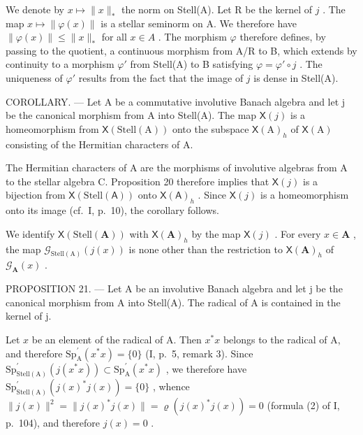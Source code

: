 We denote by \(x \mapsto \|x\|_*\) the norm on Stell(A). Let R be the kernel of \(j\) . The map \(x \mapsto \| \varphi(x) \|\) is a stellar seminorm on A. We therefore have \(\| \varphi(x) \| \leqslant \| x \|_*\) for all \(x \in A\) . The morphism \(\varphi\) therefore defines, by passing to the quotient, a continuous morphism from A/R to B, which extends by continuity to a morphism \(\varphi'\) from Stell(A) to B satisfying \(\varphi = \varphi' \circ j\) . The uniqueness of \(\varphi'\) results from the fact that the image of \(j\) is dense in Stell(A).

COROLLARY. --- Let A be a commutative involutive Banach algebra and let j be the canonical morphism from A into Stell(A). The map \(\mathsf{X}(j)\) is a homeomorphism from \(\mathsf{X}(\mathrm{Stell}(\mathrm{A}))\) onto the subspace \(\mathsf{X}(\mathrm{A})_{h}\) of \(\mathsf{X}(\mathrm{A})\) consisting of the Hermitian characters of A.

The Hermitian characters of A are the morphisms of involutive algebras from A to the stellar algebra C. Proposition 20 therefore implies that \(\mathsf{X}(j)\) is a bijection from \(\mathsf{X}(\mathrm{Stell}(\mathsf{A}))\) onto \(\mathsf{X}(\mathsf{A})_h\) . Since \(\mathsf{X}(j)\) is a homeomorphism onto its image (cf.~I, p.~10), the corollary follows.

We identify \(\mathsf{X}(\mathrm{Stell}(\mathbf{A}))\) with \(\mathsf{X}(\mathbf{A})_h\) by the map \(\mathsf{X}(j)\) . For every \(x\in \mathbf{A}\) , the map \(\mathcal{G}_{\mathrm{Stell(A)}}(j(x))\) is none other than the restriction to \(\mathsf{X}(\mathbf{A})_h\) of \(\mathcal{G}_{\mathbf{A}}(x)\) .

PROPOSITION 21. --- Let A be an involutive Banach algebra and let j be the canonical morphism from A into Stell(A). The radical of A is contained in the kernel of j.

Let \(x\) be an element of the radical of A. Then \(x^{*}x\) belongs to the radical of A, and therefore \(\mathrm{Sp}_{\mathrm{A}}^{\prime}(x^{*}x) = \{0\}\) (I, p.~5, remark 3). Since \(\mathrm{Sp}_{\mathrm{Stell(A)}}^{\prime}(j(x^{*}x)) \subset \mathrm{Sp}_{\mathrm{A}}^{\prime}(x^{*}x)\) , we therefore have \(\mathrm{Sp}_{\mathrm{Stell(A)}}^{\prime}(j(x)^{*}j(x)) = \{0\}\) , whence \(\| j(x)\| ^2 = \| j(x)^{*}j(x)\| = \varrho (j(x)^{*}j(x)) = 0\) (formula (2) of I, p.~104), and therefore \(j(x) = 0\) .
